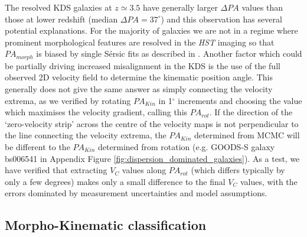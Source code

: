 \documentclass[fleqn,usenatbib]{mnras}
\newcommand{\Sers}{S\'{e}rsic }
\begin{document}
The resolved KDS galaxies at $z\simeq3.5$ have generally larger $\Delta PA$ values than those at lower redshift (median $\Delta PA = 37^{\circ}$) and this observation has several potential explanations.
For the majority of galaxies we are not in a regime where prominent morphological features are resolved in the {\em HST} imaging so that $PA_{morph}$ is biased by single \Sers fits as described in \cite{Rodrigues2017}.
Another factor which could be partially driving increased misalignment in the KDS is the use of the full observed 2D velocity field to determine the kinematic position angle.
This generally does not give the same answer as simply connecting the velocity extrema, as we verified by rotating $PA_{Kin}$ in 1$^{\circ}$ increments and choosing the value which maximises the velocity gradient, calling this $PA_{rot}$.
If the direction of the `zero-velocity strip' across the centre of the velocity maps is not perpendicular to the line connecting the velocity extrema, the $PA_{Kin}$ determined from MCMC will be different to the $PA_{Kin}$ determined from rotation (e.g. GOODS-S galaxy bs006541 in Appendix Figure \ref{fig:dispersion_dominated_galaxies}).
As a test, we have verified that extracting $V_{C}$ values along $PA_{rot}$ (which differs typically by only a few degrees) makes only a small difference to the final $V_{C}$ values, with the errors dominated by measurement uncertainties and model assumptions.


\subsection{Morpho-Kinematic classification}\label{subsec:morpho-kin-class}
\end{document}
